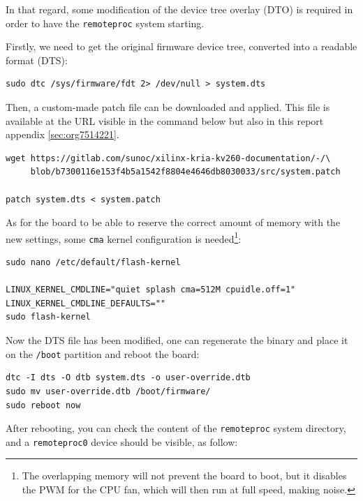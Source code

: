 \documentclass[10pt]{article}
\begin{document}
In that regard, some modification of the device tree overlay (DTO) is required in order to have
the \texttt{remoteproc} system starting.

Firstly, we need to get the original firmware device tree, converted
into a readable format (DTS):

\begin{verbatim}
sudo dtc /sys/firmware/fdt 2> /dev/null > system.dts
\end{verbatim}

Then, a custom-made patch file can be downloaded and applied.
This file is available at the URL visible in the command below
but also in this report appendix \ref{sec:org7514221}.

\begin{verbatim}
wget https://gitlab.com/sunoc/xilinx-kria-kv260-documentation/-/\
     blob/b7300116e153f4b5a1542f8804e4646db8030033/src/system.patch

patch system.dts < system.patch
\end{verbatim}

As for the board to be able to reserve the correct amount of memory with the new settings, some
\texttt{cma} kernel configuration is needed\footnote{The overlapping memory will not prevent the board to boot,
but it disables the PWM for the CPU fan, which will then run at full speed, making noise.}:

\begin{verbatim}
sudo nano /etc/default/flash-kernel

LINUX_KERNEL_CMDLINE="quiet splash cma=512M cpuidle.off=1"
LINUX_KERNEL_CMDLINE_DEFAULTS=""
sudo flash-kernel
\end{verbatim}

Now the DTS file has been modified, one can regenerate the binary and place it on the \texttt{/boot} partition
and reboot the board:

\begin{verbatim}
dtc -I dts -O dtb system.dts -o user-override.dtb
sudo mv user-override.dtb /boot/firmware/
sudo reboot now
\end{verbatim}

After rebooting, you can check the content of the \verb|remoteproc| system directory,
and a \texttt{remoteproc0} device should be visible, as follow:
\end{document}
